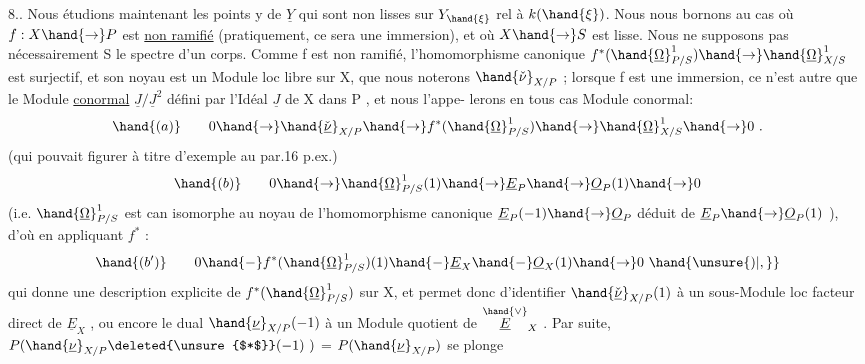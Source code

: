 
8.. Nous étudions maintenant les points  y de $\underline{Y}$ qui sont non lisses
sur $Y_{\hand{\xi}}$ rel à $k(\hand{\xi})$. Nous nous  bornons au cas où  $f:X\hand{\to} P$  est \uline{non ramifié}
(pratiquement, ce sera une immersion), et où $X\hand{\to} S$ est lisse.  Nous ne
supposons pas nécessairement S le spectre d'un corps.  
 Comme
f  est non ramifié, l'homomorphisme canonique   $f^*(\hand{\underline{\Omega}}^1_{P/S})\hand{\to}\hand{\underline{\Omega}}^1_{X/S}$
est surjectif, et son noyau est un Module loc libre sur X, que nous
noterons  $\hand{\check{\nu}}_{X/P}$ ; lorsque f est une immersion, ce n'est autre que le
Module \uline{conormal}  $\underline{J}/\underline{J}^2$  défini par l'Idéal $\underline{J}$ de X dans P , et nous l'appe-%
lerons en tous cas Module conormal:
\[ \hand{(a)} \qquad 0\hand{\to}\hand{\check{\underline{\nu}}}_{X/P}\hand{\to} f^*(\hand{\underline{\Omega}}^1_{P/S})\hand{\to}\hand{\underline{\Omega}}^1_{X/S}\hand{\to} 0 \ . \]
\margin{\hand{$|||$}}
(qui pouvait figurer à titre d'exemple au par.16 p.ex.)
\[ \hand{(b)} \qquad 0\hand{\to}\hand{\underline{\Omega}}^1_{P/S}(1)\hand{\to}\underline{E}_P\hand{\to}\underline{O}_P(1)\hand{\to} 0 \]
(i.e. $\hand{\underline{\Omega}}^1_{P/S}$ est can isomorphe au noyau de l'homomorphisme canonique
$\underline{E}_P(-1)\hand{\to}\underline{O}_P$  déduit de $\underline{E}_P\hand{\to}\underline{O}_P(1)$ ), d'où en appliquant $f^*$ :
\[ \hand{(b')} \qquad 0 \hand{-} f^*(\hand{\underline{\Omega}}^1_{P/S})(1) \hand{-} \underline{E}_X \hand{-} \underline{O}_X(1)\hand{\to} 0 \ \hand{\unsure{)|,}} \]
qui donne une description explicite de  $f^*(\hand{\underline{\Omega}}^1_{P/S})$   sur X, et
permet  donc d'identifier $\hand{\check{\underline{\nu}}}_{X/P}(1)$  à un sous-Module loc facteur direct
de $\underline{E}_X$ , ou encore le  dual  $\hand{\underline{\nu}}_{X/P}(-1)$  à un Module
quotient de $\overset{\hand{\vee}}{\underline{E}}_X$ .  Par suite,   $P(\hand{\underline{\nu}}_{X/P}\deleted{\unsure{$*$}}(-1)\ )$  =  $P(\hand{\underline{\nu}}_{X/P})$  se plonge
